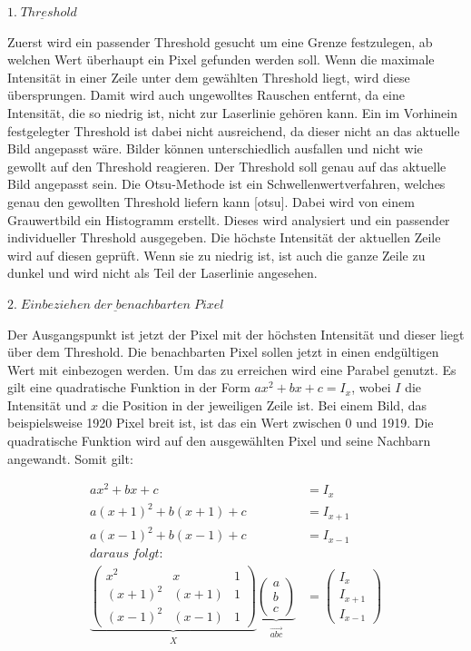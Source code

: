 	$\underline{1. \; Threshold}$
	
	Zuerst wird ein passender Threshold gesucht um eine Grenze festzulegen, ab welchen Wert überhaupt ein Pixel gefunden werden soll. Wenn die maximale Intensität in einer Zeile unter dem gewählten Threshold liegt, wird diese übersprungen. Damit wird auch ungewolltes Rauschen entfernt, da eine Intensität, die so niedrig ist, nicht zur Laserlinie gehören kann. Ein im Vorhinein festgelegter Threshold ist dabei nicht ausreichend, da dieser nicht an das aktuelle Bild angepasst wäre. Bilder können unterschiedlich ausfallen und nicht wie gewollt auf den Threshold reagieren. Der Threshold soll genau auf das aktuelle Bild angepasst sein. Die Otsu-Methode ist ein Schwellenwertverfahren, welches genau den gewollten Threshold liefern kann [otsu]. Dabei wird von einem Grauwertbild ein Histogramm erstellt. Dieses wird analysiert und ein passender individueller Threshold ausgegeben. Die höchste Intensität der aktuellen Zeile wird auf diesen geprüft. Wenn sie zu niedrig ist, ist auch die ganze Zeile zu dunkel und wird nicht als Teil der Laserlinie angesehen.
	
	$\underline{2. \; Einbeziehen \; der \; benachbarten \; Pixel}$
	
	Der Ausgangspunkt ist jetzt der Pixel mit der höchsten Intensität und dieser liegt über dem Threshold. Die benachbarten Pixel sollen jetzt in einen endgültigen Wert mit einbezogen werden. Um das zu erreichen wird eine Parabel genutzt. Es gilt eine quadratische Funktion in der Form \( ax^2 + bx + c = I_x \), wobei \( I \) die Intensität und \( x \) die Position in der jeweiligen Zeile ist. Bei einem Bild, das beispielsweise 1920 Pixel breit ist, ist das ein Wert zwischen 0 und 1919. Die quadratische Funktion wird auf den ausgewählten Pixel und seine Nachbarn angewandt. Somit gilt:
	
	\begin{equation}
	\begin{aligned}
	ax^2 + bx + c &= I_x \\
	a(x+1)^2 + b(x+1) + c &= I_{x+1} \\
	a(x-1)^2 + b(x-1) + c &= I_{x-1} \\
	daraus \; folgt: \\
	\underbrace{\begin{pmatrix}
		x^2 & x & 1 \\
		(x+1)^2 & (x+1) & 1 \\
		(x-1)^2 & (x-1) & 1 
		\end{pmatrix}}_{\substack{X}} \underbrace{ \begin{pmatrix}
		a \\
		b \\
		c
		\end{pmatrix}}_{\substack{\vec{abc}}} &= \begin{pmatrix}
	I_x \\
	I_{x+1} \\
	I_{x-1}
	\end{pmatrix}
	\end{aligned}
	\label{eq:subpixel_x}
	\end{equation}
	
